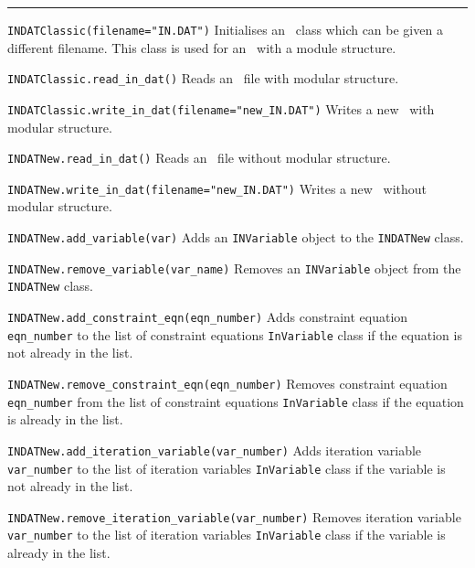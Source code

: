 \rule{\textwidth}{0.4pt}

\begin{description}

\item{\verb|INDATClassic(filename="IN.DAT")| } Initialises an \indat\ class
  which can be given a different filename. This class is used for an \indat\
  with a module structure.

\item{\verb|INDATClassic.read_in_dat()| } Reads an \indat\ file with modular
  structure.

\item{\verb|INDATClassic.write_in_dat(filename="new_IN.DAT")| } Writes a new
  \indat\ with modular structure.

\item{\verb|INDATNew.read_in_dat()| } Reads an \indat\ file without modular
  structure.

\item{\verb|INDATNew.write_in_dat(filename="new_IN.DAT")| } Writes a new
  \indat\ without modular structure.

\item{\verb|INDATNew.add_variable(var)| } Adds an \verb|INVariable| object to
  the \verb|INDATNew| class.

\item{\verb|INDATNew.remove_variable(var_name)| } Removes an
  \verb|INVariable| object from the \verb|INDATNew| class.

\item{\verb|INDATNew.add_constraint_eqn(eqn_number)|} Adds constraint
  equation \verb|eqn_number| to the list of constraint equations
  \verb|InVariable| class if the equation is not already in the list.

\item{\verb|INDATNew.remove_constraint_eqn(eqn_number)|} Removes
  constraint equation \verb|eqn_number| from the list of constraint
  equations \verb|InVariable| class if the equation is already in the list.

\item{\verb|INDATNew.add_iteration_variable(var_number)| } Adds iteration
  variable \verb|var_number| to the list of iteration variables
  \verb|InVariable| class if the variable is not already in the list.

\item{\verb|INDATNew.remove_iteration_variable(var_number)| } Removes
  iteration variable \verb|var_number| to the list of iteration variables
  \verb|InVariable| class if the variable is already in the list.

\end{description}


